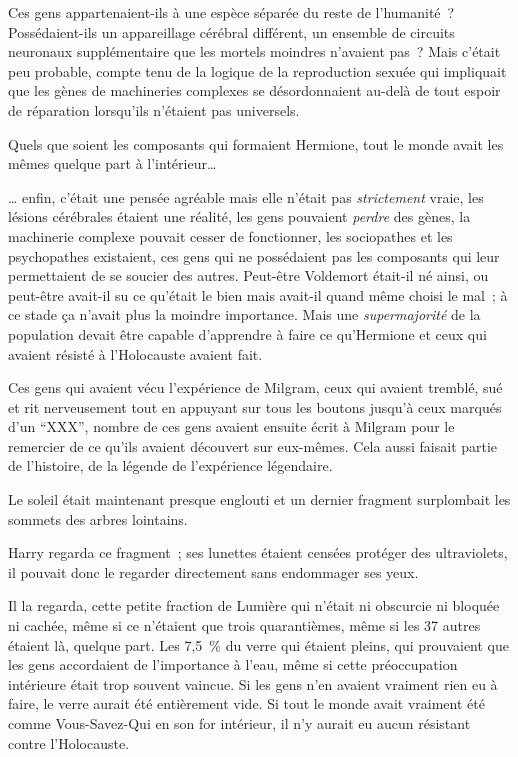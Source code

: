 Ces gens appartenaient-ils à une espèce séparée du reste de l'humanité~?
Possédaient-ils un appareillage cérébral différent, un ensemble de circuits neuronaux supplémentaire que les mortels moindres n'avaient pas~?
Mais c'était peu probable, compte tenu de la logique de la reproduction sexuée qui impliquait que les gènes de machineries complexes se désordonnaient au-delà de tout espoir de réparation lorsqu'ils n'étaient pas universels.

Quels que soient les composants qui formaient Hermione, tout le monde avait les mêmes quelque part à l'intérieur…

… enfin, c'était une pensée agréable mais elle n'était pas \emph{strictement} vraie, les lésions cérébrales étaient une réalité, les gens pouvaient \emph{perdre} des gènes, la machinerie complexe pouvait cesser de fonctionner, les sociopathes et les psychopathes existaient, ces gens qui ne possédaient pas les composants qui leur permettaient de se soucier des autres.
Peut-être Voldemort était-il né ainsi, ou peut-être avait-il su ce qu'était le bien mais avait-il quand même choisi le mal~; à ce stade ça n'avait plus la moindre importance.
Mais une \emph{supermajorité} de la population devait être capable d'apprendre à faire ce qu'Hermione et ceux qui avaient résisté à l'Holocauste avaient fait.

Ces gens qui avaient vécu l'expérience de Milgram, ceux qui avaient tremblé, sué et rit nerveusement tout en appuyant sur tous les boutons jusqu'à ceux marqués d'un “XXX”, nombre de ces gens avaient ensuite écrit à Milgram pour le remercier de ce qu'ils avaient découvert sur eux-mêmes.
Cela aussi faisait partie de l'histoire, de la légende de l'expérience légendaire.

Le soleil était maintenant presque englouti et un dernier fragment surplombait les sommets des arbres lointains.

Harry regarda ce fragment~; ses lunettes étaient censées protéger des ultraviolets, il pouvait donc le regarder directement sans endommager ses yeux.

Il la regarda, cette petite fraction de Lumière qui n'était ni obscurcie ni bloquée ni cachée, même si ce n'étaient que trois quarantièmes, même si les 37 autres étaient là, quelque part.
Les 7,5~\% du verre qui étaient pleins, qui prouvaient que les gens accordaient de l'importance à l'eau, même si cette préoccupation intérieure était trop souvent vaincue.
Si les gens n'en avaient vraiment rien eu à faire, le verre aurait été entièrement vide.
Si tout le monde avait vraiment été comme Vous-Savez-Qui en son for intérieur, il n'y aurait eu aucun résistant contre l'Holocauste.

